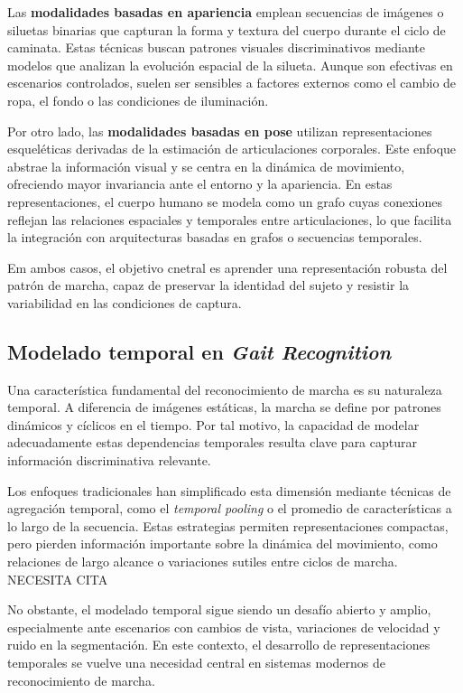 Las \textbf{modalidades basadas en apariencia} emplean secuencias de imágenes o siluetas binarias que capturan la forma y textura del cuerpo durante el ciclo de caminata. Estas técnicas buscan patrones visuales discriminativos mediante modelos que analizan la evolución espacial de la silueta. Aunque son efectivas en escenarios controlados, suelen ser sensibles a factores externos como el cambio de ropa, el fondo o las condiciones de iluminación.

Por otro lado, las \textbf{modalidades basadas en pose} utilizan representaciones esqueléticas derivadas de la estimación de articulaciones corporales. Este enfoque abstrae la información visual y se centra en la dinámica de movimiento, ofreciendo mayor invariancia ante el entorno y la apariencia. En estas representaciones, el cuerpo humano se modela como un grafo cuyas conexiones reflejan las relaciones espaciales y temporales entre articulaciones, lo que facilita la integración con arquitecturas basadas en grafos o secuencias temporales.

Em ambos casos, el objetivo cnetral es aprender una representación robusta del patrón de marcha, capaz de preservar la identidad del sujeto y resistir la variabilidad en las condiciones de captura.

\subsection{Modelado temporal en \textit{Gait Recognition}}

Una característica fundamental del reconocimiento de marcha es su naturaleza temporal. A diferencia de imágenes estáticas, la marcha se define por patrones dinámicos y cíclicos en el tiempo. Por tal motivo, la capacidad de modelar adecuadamente estas dependencias temporales resulta clave para capturar información discriminativa relevante.

Los enfoques tradicionales han simplificado esta dimensión mediante técnicas de agregación temporal, como el \textit{temporal pooling} o el promedio de características a lo largo de la secuencia. Estas estrategias permiten representaciones compactas, pero pierden información importante sobre la dinámica del movimiento, como relaciones de largo alcance o variaciones sutiles entre ciclos de marcha. NECESITA CITA

No obstante, el modelado temporal sigue siendo un desafío abierto y amplio, especialmente ante escenarios con cambios de vista, variaciones de velocidad y ruido en la segmentación. En este contexto, el desarrollo de representaciones temporales se vuelve una necesidad central en sistemas modernos de reconocimiento de marcha.

